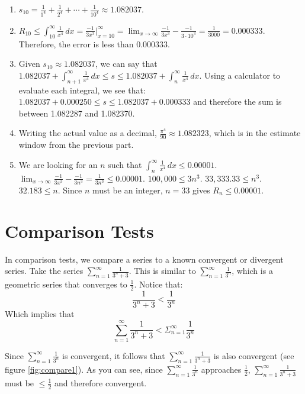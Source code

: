 \begin{Answer}[ref=remainder1]
\begin{enumerate}
\item $s_{10} = \frac{1}{1^4} + \frac{1}{2^4} + \cdots + \frac{1}{10^4} \approx 
1.082037$. 
\item $R_{10} \leq \int_{10}^\infty \frac{1}{x^4}\,dx = \frac{-1}{3x^3}|_
{x=10}^\infty = \lim_{x \to \infty} \frac{-1}{3x^3} - \frac{-1}{3 \cdot 10^3} 
= \frac{1}{3000} = 0.000333$. Therefore, the error is less than 0.000333. 
\item Given $s_{10} \approx 1.082037$, we can say that $1.082037 + \int_{n+1}^
\infty \frac{1}{x^4}\,dx \leq s \leq 1.082037 + \int_{n}^{\infty} \frac{1}{x^4}
\,dx$. Using a calculator to evaluate each integral, we see that: $1.082037 + 
0.000250 \leq s \leq 1.082037 + 0.000333$ and therefore the sum is between 
1.082287 and 1.082370. 
\item Writing the actual value as a decimal, $\frac{\pi^4}{90} \approx 
1.082323$, which is in the estimate window from the previous part. 
\item We are looking for an $n$ such that $\int_n^\infty \frac{1}{x^4}\,dx 
\leq 0.00001$. $\lim_{x \to \infty} \frac{-1}{3x^3} - \frac{-1}{3n^3} = 
\frac{1}{3n^3} \leq 0.00001$. $100,000 \leq 3n^3$. $33,333.33 \leq n^3$. 
$32.183 \leq n$. Since $n$ must be an integer, $n=33$ gives $R_n \leq 0.00001$. 
\end{enumerate}
\end{Answer}

\section{Comparison Tests}
 In comparison tests, we compare a series 
to a known convergent or divergent series. Take the series $\sum_{n=1}^\infty 
\frac{1}{3^n + 3}$. This is similar to $\sum_{n=1}^\infty \frac{1}{3^n}$, 
which is a geometric series that converges to $\frac{1}{2}$. Notice that:
$$\frac{1}{3^n + 3} < \frac{1}{3^n}$$
Which implies that 
$$\sum_{n=1}^\infty \frac{1}{3^n + 3} < \Sigma_{n=1}^\infty \frac{1}{3^n}$$

Since $\sum_{n=1}^\infty \frac{1}{3^n}$ is convergent, it follows that 
$\sum_{n=1}^\infty \frac{1}{3^n + 3}$ is also convergent (see figure 
\ref{fig:compare1}). As you can see, since  $\sum_{n=1}^\infty \frac{1}{3^n}$ 
approaches $\frac{1}{2}$, $\sum_{n=1}^\infty \frac{1}{3^n + 3}$ must be $\leq 
\frac{1}{2}$ and therefore convergent. 

